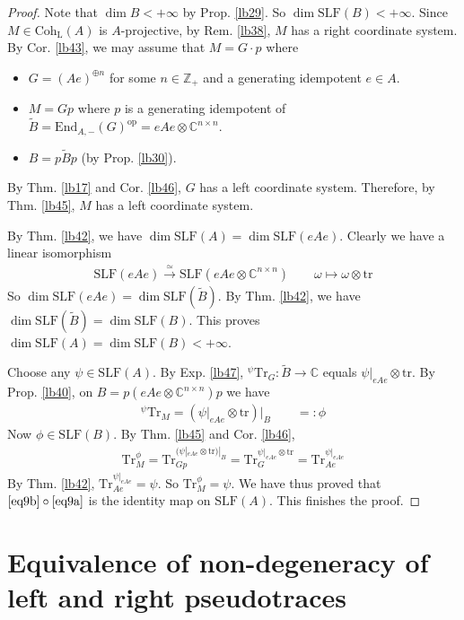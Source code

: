 \documentclass[11pt,b5paper,notitlepage]{article}
\theoremstyle{definition}
\theoremstyle{plain}
\newcommand{\wtd}{\widetilde}
\newcommand{\Tr}{\mathrm{Tr}}
\newcommand{\End}{\mathrm{End}} %
\newcommand{\opp}{\mathrm{op}}
\newcommand{\Cbb}{\mathbb C}
\newcommand{\Zbb}{\mathbb Z}
\newcommand{\Coh}{\mathrm{Coh}_{\mathrm L}}
\newcommand{\SLF}{\mathrm{SLF}}
\newcommand{\trc}{\mathrm{tr}}
\numberwithin{equation}{section}
\begin{document}
\begin{proof}
Note that $\dim B<+\infty$ by Prop. \ref{lb29}. So $\dim\SLF(B)<+\infty$. Since $M\in\Coh(A)$ is $A$-projective, by Rem. \ref{lb38}, $M$ has a right coordinate system.  By Cor. \ref{lb43}, we may assume that $M=G\cdot p$ where 
\begin{itemize}
\item $G=(Ae)^{\oplus n}$ for some $n\in\Zbb_+$ and a generating idempotent $e\in A$.
\item $M=Gp$ where $p$ is a generating idempotent of $\wtd B=\End_{A,-}(G)^\opp=eAe\otimes\Cbb^{n\times n}$.
\item $B=p\wtd Bp$ (by Prop. \ref{lb30}).
\end{itemize}
By Thm. \ref{lb17} and Cor. \ref{lb46}, $G$ has a left coordinate system. Therefore, by Thm. \ref{lb45}, $M$ has a left coordinate system.

By Thm. \ref{lb42}, we have $\dim\SLF(A)=\dim\SLF(eAe)$. Clearly we have a linear isomorphism
\begin{align*}
\SLF(eAe)\xrightarrow{\simeq}\SLF(eAe\otimes\Cbb^{n\times n})\qquad \omega\mapsto\omega\otimes\trc
\end{align*}
So $\dim\SLF(eAe)=\dim\SLF(\wtd B)$. By Thm. \ref{lb42}, we have $\dim\SLF(\wtd B)=\dim\SLF(B)$. This proves $\dim\SLF(A)=\dim\SLF(B)<+\infty$.

Choose any $\psi\in\SLF(A)$. By Exp. \ref{lb47}, ${}^\psi\Tr_G:\wtd B\rightarrow\Cbb$ equals $\psi|_{eAe}\otimes\trc$. By Prop. \ref{lb40}, on $B=p(eAe\otimes\Cbb^{n\times n})p$ we have
\begin{align*}
{}^\psi\Tr_M=(\psi|_{eAe}\otimes\trc)\big|_B\qquad=:\phi
\end{align*}
Now $\phi\in\SLF(B)$. By Thm. \ref{lb45} and Cor. \ref{lb46},
\begin{align*}
\Tr_M^\phi=\Tr_{Gp}^{(\psi|_{eAe}\otimes\trc)|_B}=\Tr_G^{\psi|_{eAe}\otimes\trc}=\Tr_{Ae}^{\psi|_{eAe}}
\end{align*}
By Thm. \ref{lb42}, $\Tr_{Ae}^{\psi|_{eAe}}=\psi$. So $\Tr_M^\phi=\psi$. We have thus proved that $\eqref{eq9b}\circ\eqref{eq9a}$ is the identity map on $\SLF(A)$. This finishes the proof.
\end{proof}






\section{Equivalence of non-degeneracy of left and right pseudotraces}
\end{document}
